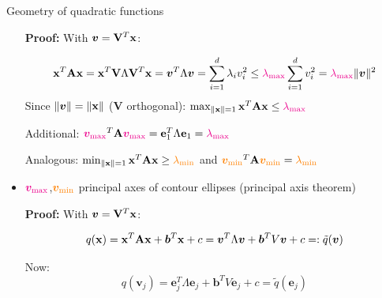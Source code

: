 \documentclass[11pt,compress,t,notes=noshow, xcolor=table]{beamer}
\begin{document}
\begin{vbframe}{Geometry of quadratic functions}
\begin{itemize}
        \vspace{0.25\baselineskip}
    
        \begin{footnotesize}
            \textbf{Proof:} With $\bm{v}=\mathbf{V}^T\mathbf{x}$:

            \vspace{-\baselineskip}
            
            \begin{equation*}
                \mathbf{x}^T\mathbf{A}\mathbf{x} = \mathbf{x}^T\mathbf{V}\Lambda\mathbf{V}^T\mathbf{x} = \bm{v}^T\Lambda\bm{v} = \sum_{i=1}^d \lambda_iv_i^2 \leq \textcolor{magenta}{\lambda_\text{max}} \sum_{i=1}^d v_i^2 = \textcolor{magenta}{\lambda_\text{max}}\|\bm{v}\|^2
            \end{equation*}
            Since $\|\bm{v}\| = \|\mathbf{x}\|$ ($\mathbf{V}$ orthogonal): $\max_{\|\mathbf{x}\|=1} \mathbf{x}^T\mathbf{A}\mathbf{x} \leq \textcolor{magenta}{\lambda_\text{max}}$
            
            Additional: $\textcolor{magenta}{\bm{v}_\text{max}}^T\mathbf{A}\textcolor{magenta}{\bm{v}_\text{max}} = \mathbf{e}_1^T\Lambda\mathbf{e}_1 = \textcolor{magenta}{\lambda_\text{max}}$

            Analogous: $\min_{\|\mathbf{x}\|=1} \mathbf{x}^T \mathbf{A} \mathbf{x} \geq \textcolor{orange}{\lambda_\text{min}}$ and $\textcolor{orange}{\bm{v}_\text{min}}^T\mathbf{A}\textcolor{orange}{\bm{v}_\text{min}} = \textcolor{orange}{\lambda_\text{min}}$
        \end{footnotesize}

    \medskip

    \item $\textcolor{magenta}{\bm{v}_\text{max}}$,$\textcolor{orange}{\bm{v}_\text{min}}$ principal axes of contour ellipses (principal axis theorem)

        \vspace{0.25\baselineskip}
    
        \begin{footnotesize}
            \textbf{Proof:} With $\bm{v}=\mathbf{V}^T\mathbf{x}$:

            \vspace{-0.5\baselineskip}

            \begin{equation*}
                q(\mathbf{x}) = \mathbf{x}^T\mathbf{A}\mathbf{x} + \bm{b}^T\mathbf{x} + c = \bm{v}^T\Lambda\bm{v} + \bm{b}^T V \bm{v} + c =: \tilde{q}(\bm{v})
            \end{equation*}

            Now:
            \begin{equation*}
                q(\bm{v}_j) = \mathbf{e}_j^T\Lambda\mathbf{e}_j + \bm{b}^T V \mathbf{e}_j + c = \tilde{q}(\mathbf{e}_j)
            \end{equation*}


\end{footnotesize}
\end{itemize}
\end{vbframe}
\end{document}
